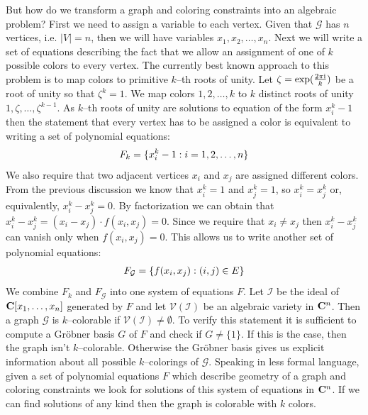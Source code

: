 But how do we transform a graph and coloring constraints into an algebraic problem? First we
need to assign a variable to each vertex. Given that $\mathcal{G}$ has $n$ vertices, i.e.
$|V| = n$, then we will have variables $x_1, x_2, \ldots, x_n$. Next we will write a set of
equations describing the fact that we allow an assignment of one of $k$ possible colors to every
vertex.  The currently best known approach to this problem is to map colors to primitive $k$--th
roots of unity. Let $\zeta = \exp(\frac{2\pi\mathrm{i}}{k})$ be a root of unity so that $\zeta^k = 1$. We
map colors $1, 2, \ldots, k$ to $k$ distinct roots of unity $1, \zeta, \ldots, \zeta^{k-1}$. As
$k$--th roots of unity are solutions to equation of the form $x_i^k - 1$ then the statement
that every vertex has to be assigned a color is equivalent to writing a set of polynomial
equations:
\begin{gather}
\begin{split}F_k = \{ x_i^k - 1 : i = 1, 2, \ldots, n \}\end{split}\notag
\end{gather}
We also require that two adjacent vertices $x_i$ and $x_j$ are assigned different colors.
From the previous discussion we know that $x_i^k = 1$ and $x_j^k = 1$, so $x_i^k = x_j^k$
or, equivalently, $x_i^k - x_j^k = 0$. By factorization we can obtain that $x_i^k - x_j^k
= (x_i - x_j) \cdot f(x_i, x_j) = 0$. Since we require that $x_i \not= x_j$ then $x_i^k -
x_j^k$ can vanish only when $f(x_i, x_j) = 0$. This allows us to write another set of
polynomial equations:
\begin{gather}
\begin{split}F_{\mathcal{G}} = \{ f(x_i, x_j) : (i, j) \in E \}\end{split}\notag
\end{gather}
We combine $F_k$ and $F_{\mathcal{G}}$ into one system of equations $F$. Let $\mathcal{I}$ be
the ideal of $\mathbf{C}[x_1, \ldots, x_n]$ generated by $F$ and let $\mathcal{V}(\mathcal{I})$ be an algebraic variety
in $\mathbf{C}^n$. Then a graph $\mathcal{G}$ is $k$--colorable if $\mathcal{V}(\mathcal{I}) \not= \emptyset$.
To verify this statement it is sufficient to compute a Gröbner basis $G$ of $F$ and check if
$G \not= \{1\}$. If this is the case, then the graph isn't $k$--colorable. Otherwise the Gröbner
basis gives us explicit information about all possible $k$--colorings of $\mathcal{G}$. Speaking in
less formal language, given a set of polynomial equations $F$ which describe geometry of a graph and
coloring constraints we look for solutions of this system of equations in $\mathbf{C}^n$. If we can find
solutions of any kind then the graph is colorable with $k$ colors.


